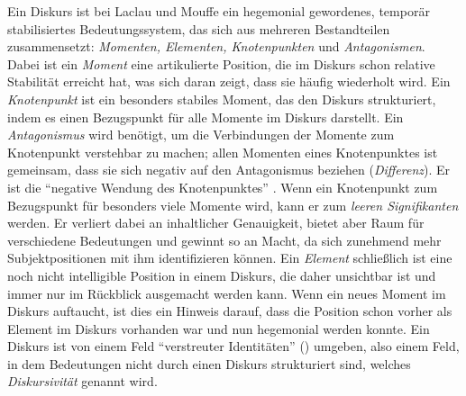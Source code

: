 \documentclass[12pt, titlepage=true, toc=bib]{scrartcl}
\begin{document}

Ein Diskurs ist bei Laclau und Mouffe ein hegemonial gewordenes, temporär stabilisiertes Bedeutungssystem, das sich aus mehreren Bestandteilen zusammensetzt: \textit{Momenten, Elementen, Knotenpunkten} und \textit{Antagonismen}. Dabei ist ein \textit{Moment} eine artikulierte Position, die im Diskurs schon relative Stabilität erreicht hat, was sich daran zeigt, dass sie häufig wiederholt wird. Ein \textit{Knotenpunkt} ist ein besonders stabiles Moment, das den Diskurs strukturiert, indem es einen Bezugspunkt für alle Momente im Diskurs darstellt. Ein \textit{Antagonismus} wird benötigt, um die Verbindungen der Momente zum Knotenpunkt verstehbar zu machen; allen Momenten eines Knotenpunktes ist gemeinsam, dass sie sich negativ auf den Antagonismus beziehen (\textit{Differenz}). Er ist die "`negative Wendung des Knotenpunktes"' \cite[6]{bruell_chancen_2006}. Wenn ein Knotenpunkt zum Bezugspunkt für besonders viele Momente wird, kann er zum \textit{leeren Signifikanten} werden. Er verliert dabei an inhaltlicher Genauigkeit, bietet aber Raum für verschiedene Bedeutungen und gewinnt so an Macht, da sich zunehmend mehr Subjektpositionen mit ihm identifizieren können. Ein \textit{Element} schließlich ist eine noch nicht intelligible Position in einem Diskurs, die daher unsichtbar ist und immer nur im Rückblick ausgemacht werden kann. Wenn ein neues Moment im Diskurs auftaucht, ist dies ein Hinweis darauf, dass die Position schon vorher als Element im Diskurs vorhanden war und nun hegemonial werden konnte. Ein Diskurs ist von einem Feld "`verstreuter Identitäten"' (\cite[vgl.][6]{bruell_chancen_2006}) umgeben, also einem Feld, in dem Bedeutungen nicht durch einen Diskurs strukturiert sind, welches \textit{Diskursivität} genannt wird. 
\end{document}
